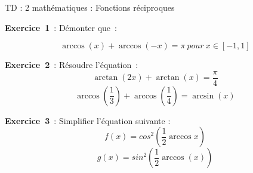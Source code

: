 \documentclass[12pt, a4paper]{article}
\begin{document}
\begin{center}
\large\sc 

TD : 2 mathématiques : Fonctions réciproques
\end{center}

{\bf Exercice~1}~: Démonter que~:

\begin{equation*}
\arccos(x) + \arccos(-x) = \pi~pour~x\in[-1,1]
\end{equation*}

{\bf Exercice~2}~: Résoudre l'équation~:
\begin{equation*}
\arctan(2x) + \arctan(x) = \frac{\pi}{4}
\end{equation*}
\begin{equation*}
\arccos (\frac{1}{3})+\arccos (\frac{1}{4})=\arcsin(x)
\end{equation*}

{\bf Exercice~3}~: Simplifier l'équation suivante :
\begin{equation*}
f(x) = cos^2(\frac{1}{2}\arccos x)
\end{equation*}
\begin{equation*}
g(x) = sin^2(\frac{1}{2}\arccos(x))
\end{equation*}
\end{document}
